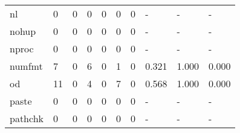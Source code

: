 \begin{longtable}{lp{1.3cm}p{1.3cm}p{1.3cm}p{1.3cm}p{1.3cm}p{1.3cm}p{1.3cm}p{1.3cm}p{1.3cm}}
nl        &                      0 &                                  0 &                                 0 &                                0 &                                 0 &                               0 &                                    - &                                      - &                                    - \\
nohup     &                      0 &                                  0 &                                 0 &                                0 &                                 0 &                               0 &                                    - &                                      - &                                    - \\
nproc     &                      0 &                                  0 &                                 0 &                                0 &                                 0 &                               0 &                                    - &                                      - &                                    - \\
numfmt    &                      7 &                                  0 &                                 6 &                                0 &                                 1 &                               0 &                                0.321 &                                  1.000 &                                0.000 \\
od        &                     11 &                                  0 &                                 4 &                                0 &                                 7 &                               0 &                                0.568 &                                  1.000 &                                0.000 \\
paste     &                      0 &                                  0 &                                 0 &                                0 &                                 0 &                               0 &                                    - &                                      - &                                    - \\
pathchk   &                      0 &                                  0 &                                 0 &                                0 &                                 0 &                               0 &                                    - &                                      - &                                    - \\

\end{longtable}
